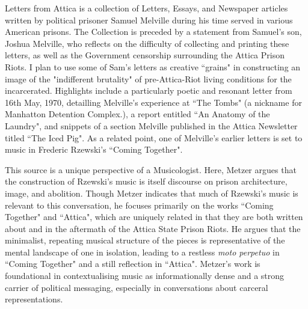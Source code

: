 \documentclass[12pt,letterpaper]{article}
\begin{document}
\clearpage


\begin{adjustwidth}{2.5em}{0pt}

	Letters from Attica is a collection of Letters, Essays, and 
	Newspaper articles written by political prisoner Samuel Melville 
	during his time served in various American prisons. The Collection 
	is preceded by a statement from Samuel's son, Joshua Melville, 
	who reflects on the difficulty of collecting and printing 
	these letters, as well as the Government censorship surrounding 
	the Attica Prison Riots. I plan to use some of Sam's letters as 
	creative ``grains" in constructing an image of the "indifferent 
	brutality" of pre-Attica-Riot living conditions for the incarcerated.
	Highlights include a particularly poetic and resonant letter from 
	16th May, 1970,  detailling Melville's experience at ``The Tombs" 
	(a nickname for Manhatton Detention Complex.), a report entitled 
	``An Anatomy of the Laundry", and snippets of a section Melville 
	published in the Attica Newsletter titled ``The Iced Pig". As a 
	related point, one of Melville's earlier letters is set to music 
	in Frederic Rzewski's ``Coming Together".

\end{adjustwidth}

\clearpage


\begin{adjustwidth}{2ex}{0pt}

  This source is a unique perspective of a Musicologist. Here, Metzer 
  argues that the construction of Rzewski's music is itself discourse 
  on prison architecture, image, and abolition. Though Metzer indicates 
  that much of Rzewski's music is relevant to this conversation, he 
  focuses primarily on the works ``Coming Together" and ``Attica", which 
  are uniquely related in that they are both written about and in the 
  aftermath of the Attica State Prison Riots. He argues that the minimalist, 
  repeating musical structure of the pieces is representative of the mental 
  landscape of one in isolation, leading to a restless \textit{moto perpetuo}
  in ``Coming Together" and a still reflection in ``Attica". Metzer's work 
  is foundational in contextualising music as informationally dense and 
  a strong carrier of political messaging, especially in conversations 
  about carceral representations.
  
\end{adjustwidth}
\end{document}
